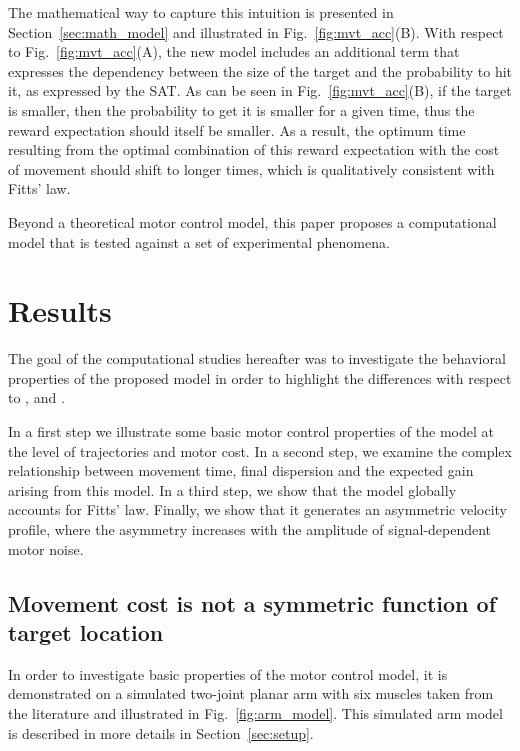 \documentclass[10pt]{article}
\begin{document}
The mathematical way to capture this intuition is presented in Section~\ref{sec:math_model} and illustrated in Fig.~\ref{fig:mvt_acc}(B).
With respect to Fig.~\ref{fig:mvt_acc}(A), the new model includes an additional term that expresses the dependency between the size of the target and the probability to hit it, as expressed by the SAT. As can be seen in Fig.~\ref{fig:mvt_acc}(B), if the target is smaller, then the probability to get it is smaller for a given time, thus the reward expectation should itself be smaller. As a result, the optimum time resulting from the optimal combination of this reward expectation with the cost of movement should shift to longer times, which is qualitatively consistent with Fitts' law.

Beyond a theoretical motor control model, this paper proposes a computational model that is tested against a set of experimental phenomena. 

\section{Results}
\label{sec:results}

The goal of the computational studies hereafter was to investigate the behavioral properties of the proposed model in order to highlight the differences with respect to \cite{shadmehr10}, \cite{rigoux12} and \cite{Dean2007}.

In a first step we illustrate some basic motor control properties of the model at the level of trajectories and motor cost.
In a second step, we examine the complex relationship between movement time, final dispersion and the expected gain arising from this model.
In a third step, we show that the model globally accounts for Fitts' law.
Finally, we show that it generates an asymmetric velocity profile, where the asymmetry increases with the amplitude of signal-dependent motor noise.

\subsection{Movement cost is not a symmetric function of target location}
\label{sec:perf_xcsf}

In order to investigate basic properties of the motor control model, it is demonstrated on a simulated two-joint planar arm with six muscles taken from the literature and illustrated in Fig.~\ref{fig:arm_model}. This simulated arm model is described in more details in Section~\ref{sec:setup}.
\end{document}

